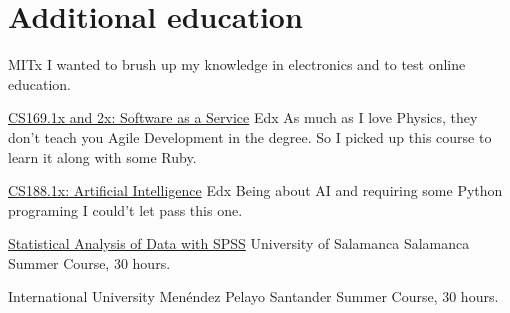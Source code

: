 \documentclass[11pt,a4paper,roman]{moderncv}
\begin{document}

\section{Additional education}


	{MITx}
	{}
	{}
	{I wanted to brush up my knowledge in electronics and to test online education.} 

	{\href{https://www.edx.org/courses/BerkeleyX/CS169.1x/2013_Spring/about}
	{CS169.1x and 2x: Software as a Service}}
	{Edx}
	{}
	{}
	{As much as I love Physics, they don't teach you Agile Development in the degree. So I picked up this course to learn it along with some Ruby.} 

	{\href{https://6002x.mitx.mit.edu/}
	{CS188.1x: Artificial Intelligence}}
	{Edx}
	{}
	{}
	{Being about AI and requiring some Python programing I could't let pass this one.} 


	{\href{http://biplot.usal.es/verano/analisis-estadistico-de-dat.html}
	{Statistical Analysis of Data with SPSS}}
	{University of Salamanca}
	{Salamanca}
	{}
	{Summer Course, 30 hours.}

	{International University Men\'endez Pelayo}
	{Santander}
	{}
	{Summer Course, 30 hours.}
\end{document}
